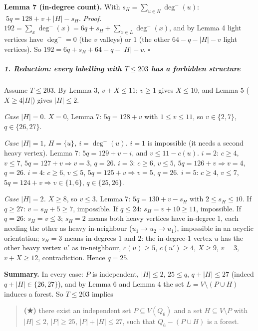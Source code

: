 \textbf{Lemma 7 (in-degree count).} With \(s_H=\sum_{u\in H}\deg^-(u)\):
\(\;5q=128+v+|H|-s_H\). \emph{Proof.}
\(192=\sum_x\deg^-(x)=6q+s_H+\sum_{x\in L}\deg^-(x)\), and by Lemma 4
light vertices have \(\deg^-=0\) (the \(v\) valleys) or \(1\) (the other
\(64-q-|H|-v\) light vertices). So \(192=6q+s_H+64-q-|H|-v\).
\(\square\)

\subparagraph{\texorpdfstring{1. Reduction: every labelling with
\(T\le203\) has a forbidden
structure}{1. Reduction: every labelling with T\textbackslash le203 has a forbidden structure}}\label{reduction-every-labelling-with-tle203-has-a-forbidden-structure}

Assume \(T\le203\). By Lemma 3, \(v+X\le11\); \(v\ge1\) gives
\(X\le10\), and Lemma 5 (\(X\ge4|H|\)) gives \(|H|\le2\).

\emph{Case \(|H|=0\).} \(X=0\), Lemma 7: \(5q=128+v\) with
\(1\le v\le11\), so \(v\in\{2,7\}\), \(q\in\{26,27\}\).

\emph{Case \(|H|=1\), \(H=\{u\}\), \(i=\deg^-(u)\).} \(i=1\) is
impossible (it needs a second heavy vertex). Lemma 7: \(5q=129+v-i\),
and \(v\le11-c(u)\). \(i=2\): \(c\ge4\), \(v\le7\),
\(5q=127+v\Rightarrow v=3\), \(q=26\). \(i=3\): \(c\ge6\), \(v\le5\),
\(5q=126+v\Rightarrow v=4\), \(q=26\). \(i=4\): \(c\ge6\), \(v\le5\),
\(5q=125+v\Rightarrow v=5\), \(q=26\). \(i=5\): \(c\ge4\), \(v\le7\),
\(5q=124+v\Rightarrow v\in\{1,6\}\), \(q\in\{25,26\}\).

\emph{Case \(|H|=2\).} \(X\ge8\), so \(v\le3\). Lemma 7:
\(5q=130+v-s_H\) with \(2\le s_H\le10\). If \(q\ge27\): \(v=s_H+5\ge7\),
impossible. If \(q\le24\): \(s_H=v+10\ge11\), impossible. If \(q=26\):
\(s_H=v\le3\); \(s_H=2\) means both heavy vertices have in-degree \(1\),
each needing the other as heavy in-neighbour (\(u_1\to u_2\to u_1\)),
impossible in an acyclic orientation; \(s_H=3\) means in-degrees \(1\)
and \(2\): the in-degree-1 vertex \(u\) has the other heavy vertex
\(u'\) as in-neighbour, \(c(u)\ge5\), \(c(u')\ge4\), \(X\ge9\), \(v=3\),
\(v+X\ge12\), contradiction. Hence \(q=25\).

\textbf{Summary.} In every case: \(P\) is independent, \(|H|\le2\),
\(25\le q\), \(q+|H|\le27\) (indeed \(q+|H|\in\{26,27\}\)), and by Lemma
6 and Lemma 4 the set \(L=V\setminus(P\cup H)\) induces a forest. So
\(T\le203\) implies

\begin{quote}
\textbf{(★)} there exist an independent set \(P\subseteq V(Q_6)\) and a
set \(H\subseteq V\setminus P\) with \(|H|\le2\), \(|P|\ge25\),
\(|P|+|H|\le27\), such that \(Q_6-(P\cup H)\) is a forest.
\end{quote}

